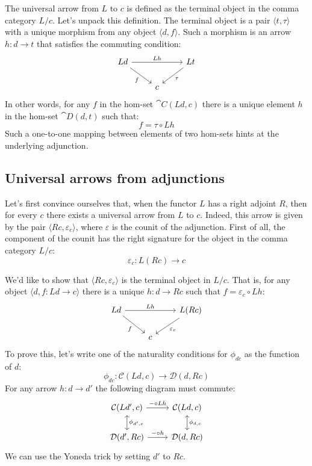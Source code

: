 \documentclass[DaoFP]{subfiles}
\begin{document}
The universal arrow from $L$ to $c$ is defined as the terminal object in the comma category $L / c$. Let's unpack this definition. The terminal object is a pair $\langle t, \tau \rangle$ with a unique morphism from any object $\langle d, f \rangle$. Such a morphism is an arrow $h \colon d \to t$ that satisfies the commuting condition:
\[
 \begin{tikzcd}
 L d
 \arrow[rd, "f"']
 \arrow[rr, "L h"]
 && L t
 \arrow[ld, "\tau"]
 \\
 &c
  \end{tikzcd}
\]
In other words, for any $f$ in the hom-set $\cat C (L d, c)$ there is a unique element $h$ in the hom-set $\cat D (d, t)$ such that:
\[ f = \tau \circ L h \]
Such a one-to-one mapping between elements of two hom-sets hints at the underlying adjunction. 

\subsection{Universal arrows from adjunctions}

Let's first convince ourselves that, when the functor $L$ has a right adjoint $R$, then for every $c$ there exists a universal arrow from $L$ to $c$. Indeed, this arrow is given by the pair $\langle R c, \varepsilon_c \rangle$, where $\varepsilon$ is the counit of the adjunction. First of all, the component of the counit has the right signature for the object in the comma category $L/c$:
\[ \varepsilon_c \colon L (R c) \to c \]

We'd like to show that $\langle R c, \varepsilon_c \rangle$ is the terminal object in $L/c$. That is, for any object $\langle d, f \colon L d \to c \rangle$ there is a unique $h \colon d \to R c$ such that $f = \varepsilon_c \circ L h$:
\[
 \begin{tikzcd}
 L d
 \arrow[rd, "f"']
 \arrow[rr, "L h"]
 && L (R c)
 \arrow[ld, "\varepsilon_c"]
 \\
 &c
  \end{tikzcd}
\]
To prove this, let's write one of the naturality conditions for $\phi_{d c}$ as the function of $d$:
\[  \phi_{d c} \colon \mathcal{C} (L d, c) \to \mathcal{D}( d , R c)\]
For any arrow $h \colon d \to d'$ the following diagram must commute:
\[
 \begin{tikzcd}
 \mathcal{C}(L d', c)
 \arrow[d, leftrightarrow, "\phi_{d', c}"]
 \arrow[r, "- \circ L h"]
 &
 \mathcal{C}(L d, c)
  \arrow[d, leftrightarrow, "\phi_{d, c}"]
 \\
 \mathcal{D}(d', R c)
 \arrow[r, "- \circ h"]
& \mathcal{D}(d, R c)
 \end{tikzcd}
\]
We can use the Yoneda trick by setting $d'$ to $R c$.
\end{document}
